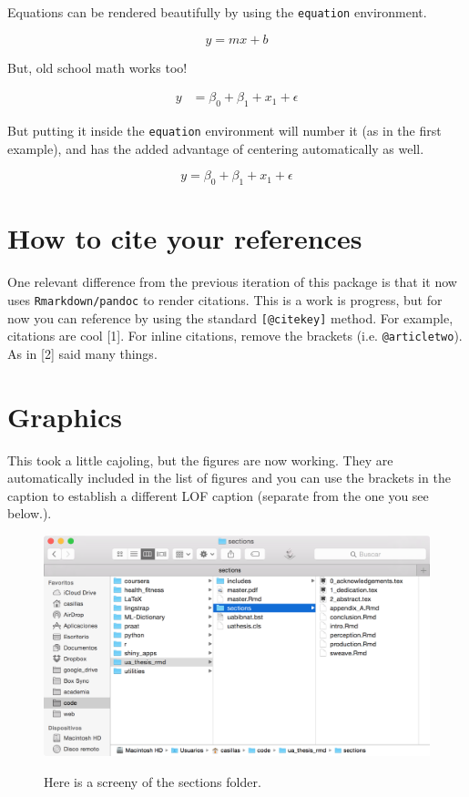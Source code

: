 \documentclass[11pt,report]{uncdissertation}
\begin{document}
Equations can be rendered beautifully by using the \texttt{equation}
environment.

\begin{equation}
    y = mx + b
\end{equation}

But, old school math works too!

\[ \begin{aligned} y &= \beta_0 + \beta_1 + x_1 + \epsilon \end{aligned} \]

But putting it inside the \texttt{equation} environment will number it
(as in the first example), and has the added advantage of centering
automatically as well.

\begin{equation}
    y = \beta_0 + \beta_1 + x_1 + \epsilon
\end{equation}

\section{\texorpdfstring{How to cite your
references\label{ref_citation}}{How to cite your references}}\label{how-to-cite-your-references}

One relevant difference from the previous iteration of this package is
that it now uses \texttt{Rmarkdown/pandoc} to render citations. This is
a work is progress, but for now you can reference by using the standard
\texttt{{[}@citekey{]}} method. For example, citations are cool {[}1{]}.
For inline citations, remove the brackets (i.e. \texttt{@articletwo}).
As in {[}2{]} said many things.

\section{\texorpdfstring{Graphics\label{graphics}}{Graphics}}\label{graphics}

This took a little cajoling, but the figures are now working. They are
automatically included in the list of figures and you can use the
brackets in the caption to establish a different LOF caption (separate
from the one you see below.).

\begin{figure}[h]
    \centering
    \caption[Example figure]{Here is a screeny of the sections folder.}
    \includegraphics[width=.75\textwidth]{./includes/figures/ex.png}
    \label{fig:firstfig}
\end{figure}
\end{document}
